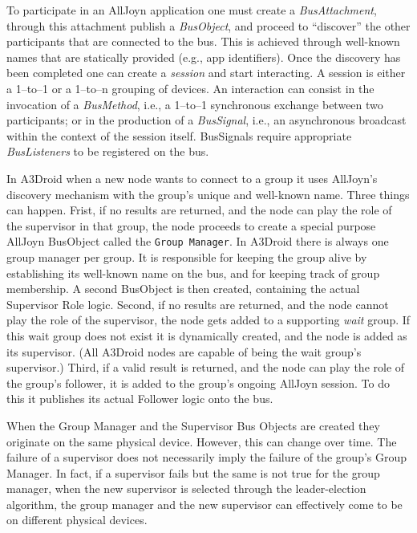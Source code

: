 To participate in an AllJoyn application one must create a \emph{BusAttachment}, through this attachment publish a \emph{BusObject}, and proceed to ``discover'' the other participants that are connected to the bus. This is achieved through well-known names that are statically provided (e.g., app identifiers). Once the discovery has been completed one can create a \emph{session} and start interacting. A session is either a 1--to--1 or a 1--to--n grouping of devices. An interaction can consist in the invocation of a \emph{BusMethod}, i.e., a 1--to--1 synchronous exchange between two participants; or in the production of a \emph{BusSignal}, i.e., an asynchronous broadcast within the context of the session itself. BusSignals require appropriate \emph{BusListeners} to be registered on the bus.

In A3Droid when a new node wants to connect to a group it uses AllJoyn's discovery mechanism with the group's unique and well-known name. Three things can happen. Frist, if no results are returned, and the node can play the role of the supervisor in that group, the node proceeds to create a special purpose AllJoyn BusObject called the \texttt{Group Manager}. In A3Droid there is always one group manager per group. It is responsible for keeping the group alive by establishing its well-known name on the bus, and for keeping track of group membership. A second BusObject is then created, containing the actual Supervisor Role logic. Second, if no results are returned, and the node cannot play the role of the supervisor, the node gets added to a supporting \emph{wait} group. If this wait group does not exist it is dynamically created, and the node is added as its supervisor. (All A3Droid nodes are capable of being the wait group's supervisor.) Third, if a valid result is returned, and the node can play the role of the group's follower, it is added to the group's ongoing AllJoyn session. To do this it publishes its actual Follower logic onto the bus. 

When the Group Manager and the Supervisor Bus Objects are created they originate on the same physical device. However, this can change over time. The failure of a supervisor does not necessarily imply the failure of the group's Group Manager. In fact, if a supervisor fails but the same is not true for the group manager, when the new supervisor is selected through the leader-election algorithm, the group manager and the new supervisor can effectively come to be on different physical devices. 

